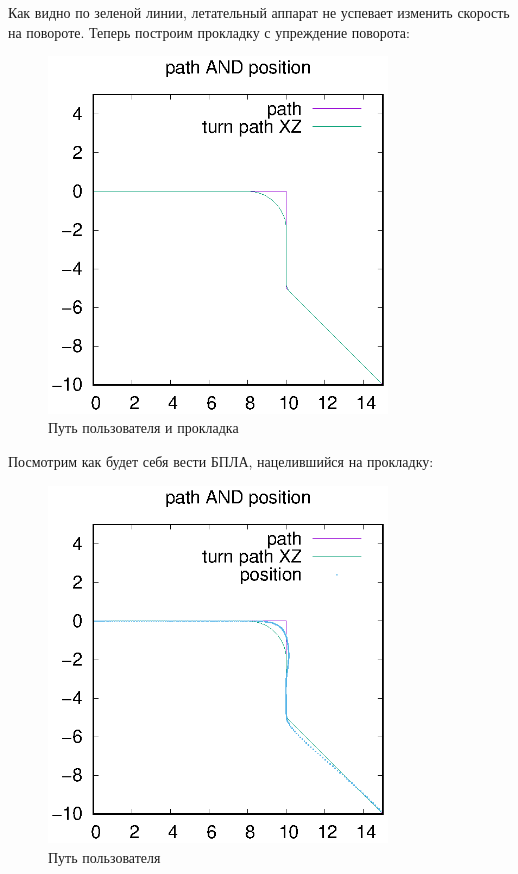 \documentclass[a4paper,12pt]{article}
\newcounter{def}
\begin{document}
Как видно по зеленой линии, летательный аппарат не успевает изменить скорость на повороте.
Теперь построим прокладку с упреждение поворота:

\begin{figure}[ht!]
\centering
\includegraphics[width=90mm]{default_path_prokladka.eps}
\caption{ Путь пользователя и прокладка}\label{prokladka}
\end{figure}

Посмотрим как будет себя вести БПЛА, нацелившийся на прокладку: 

\begin{figure}[ht!]
\centering
\includegraphics[width=90mm]{default_path_prokladka_position.eps}
\caption{ Путь пользователя}\label{user_path_position}
\end{figure}
\end{document}
